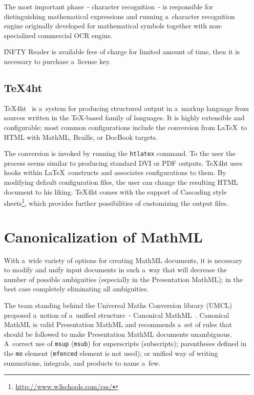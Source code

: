 \documentclass[11pt,oneside,final]{fithesis2}
\begin{document}
The most important phase~- character recognition~- is responsible for distinguishing mathematical expressions and running a~character recognition engine originally developed for mathematical symbols together with non-specialized commercial OCR engine. 

INFTY Reader is available free of charge for limited amount of time, then it is necessary to purchase a~license key.

\subsection{\TeX 4ht}
\TeX 4ht~\cite{tex4ht:gurari2004} is a~system for producing structured output in a~markup language from sources written in the \TeX -based family of languages. It is highly extensible and configurable; most common configurations include the conversion from \LaTeX\ to HTML with MathML, Braille, or DocBook targets.

The conversion is invoked by running the \texttt{htlatex} command. To the user the process seems similar to producing standard DVI or PDF outputs. \TeX 4ht uses hooks within \LaTeX\ constructs and associates configurations to them. By modifying default configuration files, the user can change the resulting HTML document to his liking. \TeX 4ht comes with the support of Cascading style sheets\footnote{\url{http://www.w3schools.com/css/}}, which provides further possibilities of customizing the output files. 

\section{Canonicalization of MathML}
\label{section:canonicalization}
With a~wide variety of options for creating MathML documents, it is necessary to modify and unify input documents in such a~way that will decrease the number of possible ambiguities (especially in the Presentation MathML); in the best case completely eliminating all ambiguities. 

The team standing behind the Universal Maths Conversion library (UMCL)~\cite{umcl:archambault2004towards} proposed a~notion of a~unified structure~- Canonical MathML~\cite{umcl:archambault2006canonical}. Canonical MathML is valid Presentation MathML and recommends a~set of rules that should be followed to make Presentation MathML documents unambiguous. A~correct use of \texttt{msup} (\texttt{msub}) for superscripts (subscripts); parentheses defined in the \texttt{mo} element (\texttt{mfenced} element is not used); or unified way of writing summations, integrals, and products to name a~few. 
\end{document}
